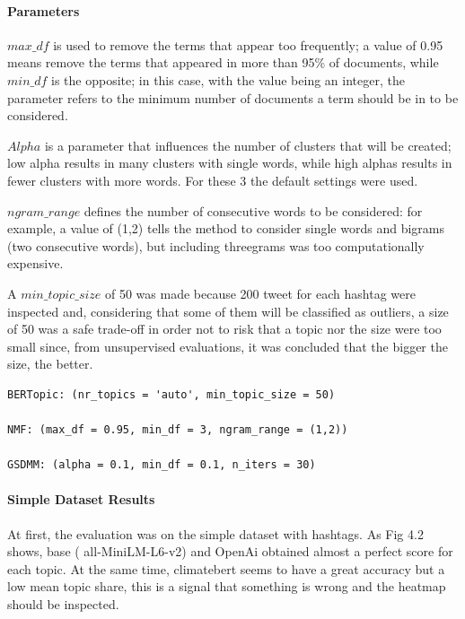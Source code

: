 \paragraph{Parameters}

$max\_df$ is used to remove the terms that appear too frequently; a value of 0.95 means remove the terms that appeared in more than 95\% of documents, while 
$min\_df$ is the opposite; in this case, with the value being an integer, the parameter refers to the minimum number of documents a term should be in to be considered.

$Alpha$ is a parameter that influences the number of clusters that will be created; low alpha results in many clusters with single words, while high alphas results in fewer clusters with more words.
For these 3 the default settings were used.


$ngram\_range$  defines the number of consecutive words to be considered: for example, a value of (1,2) tells the method to consider single words and bigrams (two consecutive words), but including threegrams was too computationally expensive.

 A $min\_topic\_size$ of 50 was made because 200 tweet for each hashtag were inspected and, considering that some of them will be classified as outliers, a size of 50 was a safe trade-off in order not to risk that a topic nor the size were too small since, from unsupervised evaluations, it was  concluded that the bigger the size, the better.

\begin{verbatim}
BERTopic: (nr_topics = 'auto', min_topic_size = 50)

NMF: (max_df = 0.95, min_df = 3, ngram_range = (1,2))

GSDMM: (alpha = 0.1, min_df = 0.1, n_iters = 30)
\end{verbatim}


\paragraph{Simple Dataset Results}
 At first, the evaluation was on the simple dataset with hashtags. As Fig 4.2 shows, base ( all-MiniLM-L6-v2) and OpenAi obtained almost a perfect score for each topic. At the same time, climatebert seems to have a great accuracy but a low mean topic share, this is a signal that something is wrong and the heatmap should be inspected.

